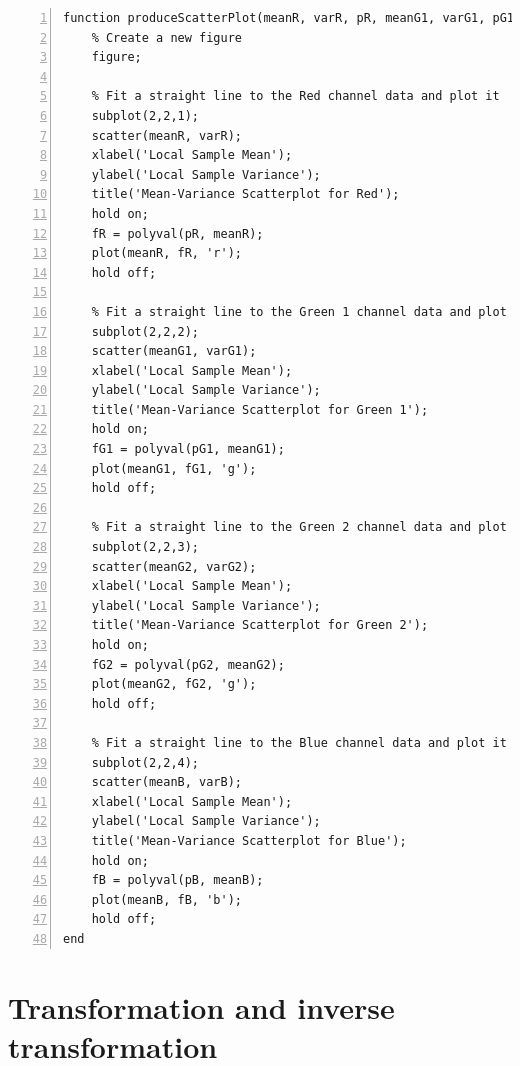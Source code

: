 \documentclass[12pt,a4paper,english
]{tunithesis}
\begin{document}
\begin{lstlisting}[style=Matlab-editor, numbers=left, basicstyle=\small]
function produceScatterPlot(meanR, varR, pR, meanG1, varG1, pG1, meanG2, varG2, pG2, meanB, varB, pB)
    % Create a new figure
    figure;
    
    % Fit a straight line to the Red channel data and plot it
    subplot(2,2,1);
    scatter(meanR, varR);
    xlabel('Local Sample Mean');
    ylabel('Local Sample Variance');
    title('Mean-Variance Scatterplot for Red');
    hold on;
    fR = polyval(pR, meanR);
    plot(meanR, fR, 'r');
    hold off;
    
    % Fit a straight line to the Green 1 channel data and plot it
    subplot(2,2,2);
    scatter(meanG1, varG1);
    xlabel('Local Sample Mean');
    ylabel('Local Sample Variance');
    title('Mean-Variance Scatterplot for Green 1');
    hold on;
    fG1 = polyval(pG1, meanG1);
    plot(meanG1, fG1, 'g');
    hold off;

    % Fit a straight line to the Green 2 channel data and plot it
    subplot(2,2,3);
    scatter(meanG2, varG2);
    xlabel('Local Sample Mean');
    ylabel('Local Sample Variance');
    title('Mean-Variance Scatterplot for Green 2');
    hold on;
    fG2 = polyval(pG2, meanG2);
    plot(meanG2, fG2, 'g');
    hold off;
    
    % Fit a straight line to the Blue channel data and plot it
    subplot(2,2,4);
    scatter(meanB, varB);
    xlabel('Local Sample Mean');
    ylabel('Local Sample Variance');
    title('Mean-Variance Scatterplot for Blue');
    hold on;
    fB = polyval(pB, meanB);
    plot(meanB, fB, 'b');
    hold off;
end
\end{lstlisting}

\section{Transformation and inverse transformation}
\end{document}
